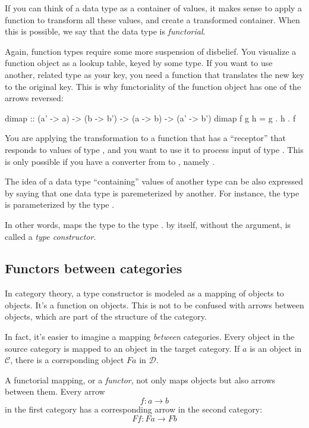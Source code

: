 \documentclass[DaoFP]{subfiles}
\begin{document}
If you can think of a data type as a container of values, it makes sense to apply a function to transform all these values, and create a transformed container. When this is possible, we say that the data type is \emph{functorial}. 

Again, function types require some more suspension of disbelief. You visualize a function object as a lookup table, keyed by some type. If you want to use another, related type as your key, you need a function that translates the new key to the original key. This is why functoriality of the function object has one of the arrows reversed:
\begin{haskell}
dimap :: (a' -> a) -> (b -> b') -> (a -> b) -> (a' -> b')
dimap f g h = g . h . f
\end{haskell}
You are applying the transformation to a function  that has a ``receptor'' that responds to values of type , and you want to use it to process input of type . This is only possible if you have a converter from  to , namely .


The idea of a data type ``containing'' values of another type can be also expressed by saying that one data type is paremeterized by another. For instance, the type  is parameterized by the type . 

In other words,  maps the type  to the type .  by itself, without the argument, is called a \emph{type constructor}. 

\subsection{Functors between categories}
In category theory, a type constructor is modeled as a mapping of objects to objects. It's a function on objects. This is not to be confused with arrows between objects, which are part of the structure of the category. 

In fact, it's easier to imagine a mapping \emph{between} categories. Every object in the source category is mapped to an object in the target category. If $a$ is an object in $\mathcal{C}$, there is a corrsponding object $F a$ in $\mathcal{D}$.

A functorial mapping, or a \emph{functor}, not only maps objects but also arrows between them. Every arrow 
\[ f \colon a \to b\]
in the first category has a corresponding arrow in the second category:
\[ F f \colon F a \to F b\]
\end{document}
